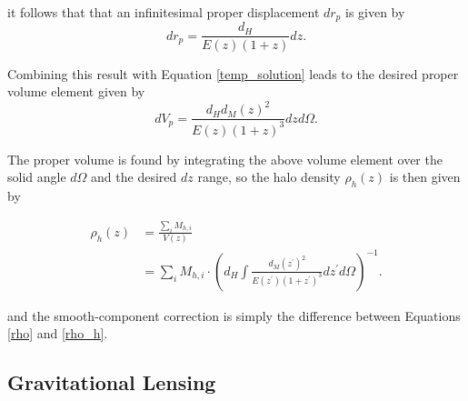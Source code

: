 \documentclass[%
 reprint,
 amsmath,amssymb,
 aps,nofootinbib
]{revtex4-1}
\begin{document}
\noindent it follows that that an infinitesimal proper displacement $dr_p$ is given by
\begin{equation}\label{physical2comoving_inf}
dr_p=\frac{d_H}{E(z)(1+z)}dz.
\end{equation}

\noindent Combining this result with Equation \eqref{temp_solution} leads to the desired proper volume element given by
\begin{equation}\label{pvolume_element}
dV_p=\frac{d_Hd_M(z)^2}{E(z)(1+z)^3}dzd\Omega.
\end{equation}

The proper volume is found by integrating the above volume element over the solid angle $d\Omega$ and the desired $dz$ range, so the halo density $\rho_h(z)$ is then given by

\begin{align}\label{rho_h}
\rho_h(z)&=\frac{\sum_i M_{h,i}}{V(z)}\nonumber\\
&=\sum_i M_{h,i}\cdot\left(d_H\int\frac{d_M(z^\prime)^2}{E(z^\prime)(1+z^\prime)^3}dz^\prime d\Omega\right)^{-1}.
\end{align}

\noindent and the smooth-component correction is simply the difference between Equations \eqref{rho} and \eqref{rho_h}.


\subsection{Gravitational Lensing} \label{grav_lensing}
\end{document}

